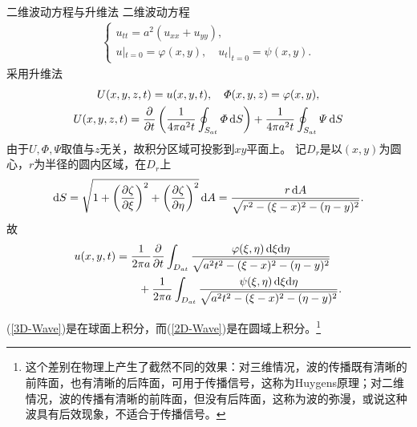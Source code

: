 \iffalse
\begin{align*}
	\varphi\begin{pmatrix}
		\xi \\\eta\\\zeta
	\end{pmatrix}=\varphi\begin{pmatrix}
		x+at\sin\theta\cos\phi \\
		y+at\sin\theta\sin\phi \\
		z+at\cos\theta
	\end{pmatrix}.
\end{align*}
\fi
\begin{example}{二维波动方程与升维法}{}
	二维波动方程
	\begin{align*}
		\begin{cases}
			u_{tt}=a^2(u_{xx}+u_{yy}), \\
			u|_{t=0}=\varphi(x,y),\quad u_t|_{t=0}=\psi(x,y).
		\end{cases}
	\end{align*}
	采用升维法
	\begin{gather*}
		U(x,y,z,t)=u(x,y,t),\quad\varPhi(x,y,z)=\varphi(x,y),\\
		U(x,y,z,t)=\frac{\partial^{\;\!\!}}{\partial t^{\;\!\!}}\left(\frac1{4\pi a^2t}\oint_{S_{at}}\varPhi\mathop{}\!\mathrm{d} S\right)+\frac1{4\pi a^2t}\oint_{S_{at}}\varPsi\mathop{}\!\mathrm{d} S
	\end{gather*}
	由于$U,\varPhi,\varPsi$取值与$z$无关，故积分区域可投影到$xy$平面上。
	记$D_r$是以$(x,y)$为圆心，$r$为半径的圆内区域，在$D_r$上
	\[
		\d S=\sqrt{1+\kh{\pv\zeta\xi}^2+\kh{\pv\zeta\eta}^2}\d A=\frac{r\d A}{\sqrt{r^2-(\xi-x)^2-(\eta-y)^2}}.
	\]
	故
	\begin{align}\label{2D-Wave}
		\begin{aligned}
			u(x,y,t)&= \frac1{2\pi a}\frac{\partial^{\;\!\!}}{\partial t^{\;\!\!}}\int_{D_{at}}\frac{\varphi(\xi,\eta)\mathop{}\!\mathrm{d}\xi\mathrm{d}\eta}{\sqrt{a^2t^2-(\xi-x)^2-(\eta-y)^2}} \\
			&\qquad +\frac1{2\pi a}\int_{D_{at}}\frac{\psi(\xi,\eta)\mathop{}\!\mathrm{d}\xi\mathrm{d}\eta}{\sqrt{a^2t^2-(\xi-x)^2-(\eta-y)^2}}.
		\end{aligned}
	\end{align}
\end{example}
(\ref{3D-Wave})是在球面上积分，而(\ref{2D-Wave})是在圆域上积分。\footnote{这个差别在物理上产生了截然不同的效果：对三维情况，波的传播既有清晰的前阵面，也有清晰的后阵面，可用于传播信号，这称为Huygens原理；对二维情况，波的传播有清晰的前阵面，但没有后阵面，这称为波的弥漫，或说这种波具有后效现象，不适合于传播信号。}
